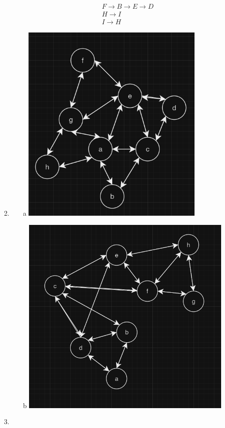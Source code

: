 \documentclass[12pt]{article}
\begin{document}
\begin{enumerate}
\begin{equation*}
\begin{split}
	    		F \rightarrow B \rightarrow E \rightarrow D\\
	    		H \rightarrow I\\
	    		I \rightarrow H
	    	\end{split}
	    \end{equation*}
	\item 
	    \begin{itemize}
		\item [a] \includegraphics*[height=10cm]{1}
		\item [b] \includegraphics*[height=10cm]{2}
	    \end{itemize}
	\item 
	    \begin{itemize}

\end{itemize}
\end{enumerate}
\end{document}
